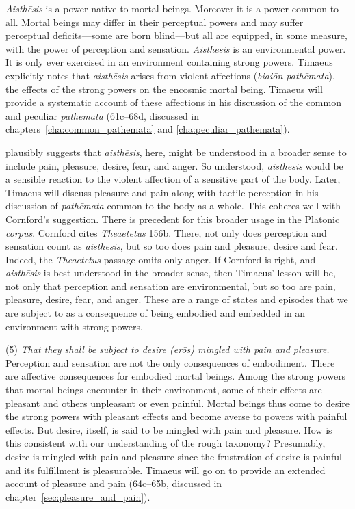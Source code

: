 \emph{Aisthēsis} is a power native to mortal beings. Moreover it is a power common to all. Mortal beings may differ in their perceptual powers and may suffer perceptual deficits---some are born blind---but all are equipped, in some measure, with the power of perception and sensation. \emph{Aisthēsis} is an environmental power. It is only ever exercised in an environment containing strong powers. Timaeus explicitly notes that \emph{aisthēsis} arises from violent affections (\emph{biaiōn pathēmata}), the effects of the strong powers on the encosmic mortal being. Timaeus will provide a systematic account of these affections in his discussion of the common and peculiar \emph{pathēmata} (61c--68d, discussed in chapters~\ref{cha:common_pathemata} and \ref{cha:peculiar_pathemata}).

\citet[143 n2]{Cornford:1935fk} plausibly suggests that \emph{aisthēsis}, here, might be understood in a broader sense to include pain, pleasure, desire, fear, and anger. So understood, \emph{aisthēsis} would be a sensible reaction to the violent affection of a sensitive part of the body. Later, Timaeus will discuss pleasure and pain along with tactile perception in his discussion of \emph{pathēmata} common to the body as a whole. This coheres well with Cornford's suggestion. There is precedent for this broader usage in the Platonic \emph{corpus}. Cornford cites \emph{Theaetetus} 156b. There, not only does perception and sensation count as \emph{aisthēsis}, but so too does pain and pleasure, desire and fear. Indeed, the \emph{Theaetetus} passage omits only anger. If Cornford is right, and \emph{aisthēsis} is best understood in the broader sense, then Timaeus' lesson will be, not only that perception and sensation are environmental, but so too are pain, pleasure, desire, fear, and anger. These are a range of states and episodes that we are subject to as a consequence of being embodied and embedded in an environment with strong powers.

(5) \emph{That they shall be subject to desire (\emph{erōs}) mingled with pain and pleasure.} Perception and sensation are not the only consequences of embodiment. There are affective consequences for embodied mortal beings.  Among the strong powers that mortal beings encounter in their environment, some of their effects are pleasant and others unpleasant or even painful. Mortal beings thus come to desire the strong powers with pleasant effects and become averse to powers with painful effects. But desire, itself, is said to be mingled with pain and pleasure. How is this consistent with our understanding of the rough taxonomy? Presumably, desire is mingled with pain and pleasure since the frustration of desire is painful and its fulfillment is pleasurable. Timaeus will go on to provide an extended account of pleasure and pain (64c--65b, discussed in chapter~\ref{sec:pleasure_and_pain}).

